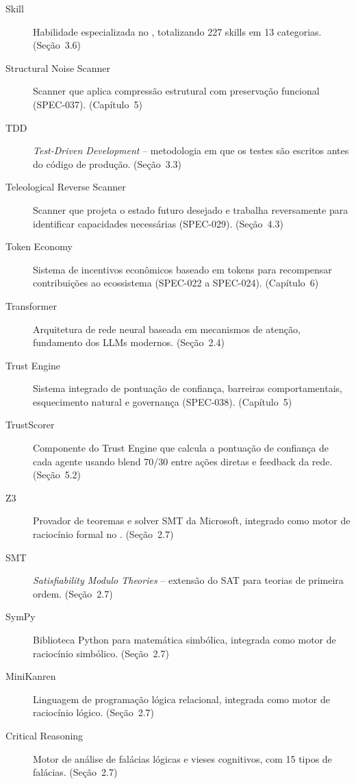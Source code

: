 \begin{description}
\item[Skill] Habilidade especializada no \opencodeeco{}, totalizando
227 skills em 13 categorias. (Seção~3.6)

\item[Structural Noise Scanner] Scanner que aplica compressão estrutural
com preservação funcional (SPEC-037). (Capítulo~5)

\item[TDD] \emph{Test-Driven Development} -- metodologia em que os
testes são escritos antes do código de produção. (Seção~3.3)

\item[Teleological Reverse Scanner] Scanner que projeta o estado futuro
desejado e trabalha reversamente para identificar capacidades
necessárias (SPEC-029). (Seção~4.3)

\item[Token Economy] Sistema de incentivos econômicos baseado em tokens
para recompensar contribuições ao ecossistema (SPEC-022 a SPEC-024).
(Capítulo~6)

\item[Transformer] Arquitetura de rede neural baseada em mecanismos de
atenção, fundamento dos LLMs modernos. (Seção~2.4)

\item[Trust Engine] Sistema integrado de pontuação de confiança, barreiras
comportamentais, esquecimento natural e governança (SPEC-038).
(Capítulo~5)

\item[TrustScorer] Componente do Trust Engine que calcula a pontuação
de confiança de cada agente usando blend 70/30 entre ações diretas e
feedback da rede. (Seção~5.2)

\item[Z3] Provador de teoremas e solver SMT da Microsoft, integrado
como motor de raciocínio formal no \opencodeeco{}. (Seção~2.7)

\item[SMT] \emph{Satisfiability Modulo Theories} -- extensão do SAT
para teorias de primeira ordem. (Seção~2.7)

\item[SymPy] Biblioteca Python para matemática simbólica, integrada
como motor de raciocínio simbólico. (Seção~2.7)

\item[MiniKanren] Linguagem de programação lógica relacional, integrada
como motor de raciocínio lógico. (Seção~2.7)

\item[Critical Reasoning] Motor de análise de falácias lógicas e vieses
cognitivos, com 15 tipos de falácias. (Seção~2.7)


\end{description}
